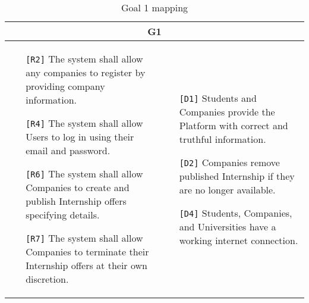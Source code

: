 \begin{table}[H]
 \centering
 \begin{tabular}{|p{7cm}|p{7cm}|}
  \hline
  \multicolumn{2}{|c|}{G1} \\
  \hline
  \begin{itemize}
   \item[\texttt{[R2]}] The system shall allow any companies to register by providing company information.
   \item[\texttt{[R4]}] The system shall allow Users to log in using their email and password.
   \item[\texttt{[R6]}] The system shall allow Companies to create and publish Internship offers specifying details.
   \item[\texttt{[R7]}]The system shall allow Companies to terminate their Internship offers at their own discretion.
  \end{itemize} &
  \begin{itemize}
   \item[\texttt{[D1]}] Students and Companies provide the Platform with correct and truthful information.
   \item[\texttt{[D2]}] Companies remove published Internship if they are no longer available.
   \item[\texttt{[D4]}] Students, Companies, and Universities have a working internet connection.
  \end{itemize} \\ \hline
 \end{tabular}
 \caption{Goal 1 mapping}
 \label{tab:G1}
\end{table}

